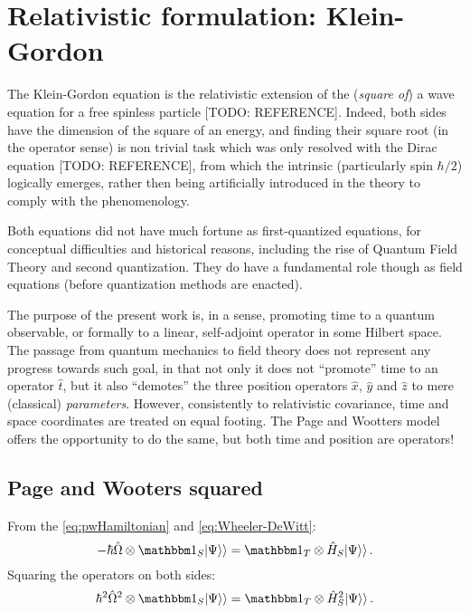 \section{Relativistic formulation: Klein-Gordon}

The Klein-Gordon equation is the relativistic extension of the
(\emph{square of}) a wave equation for a free spinless particle
[TODO: REFERENCE]. Indeed, both sides have the dimension of
the square of an energy, and finding their square root
(in the operator sense) is non trivial task which was only resolved 
with the Dirac equation [TODO: REFERENCE], from which the
intrinsic  (particularly spin $\hbar/2$) logically emerges,
rather then being artificially introduced in the theory
to comply with the phenomenology.

Both equations did not have much fortune as first-quantized equations,
for conceptual difficulties and historical reasons, including the rise
of Quantum Field Theory and second quantization. They do have a fundamental
role though as field equations (before quantization methods are enacted).

The purpose of the present work is, in a sense, promoting time to a quantum
observable, or formally to a linear, self-adjoint operator in some Hilbert space.
The passage from quantum mechanics to field theory does not represent any progress
towards such goal, in that not only it does not ``promote'' time to an operator $\hat{t}$,
but it also ``demotes'' the three position operators $\hat{x}$, $\hat{y}$ and $\hat{z}$
to mere (classical) \emph{parameters}. However, consistently to relativistic covariance,
time and space coordinates are treated on equal footing. The Page and Wootters model
offers the opportunity to do the same, but both time and position are operators!

\subsection{Page and Wooters squared}

From the \eqref{eq:pwHamiltonian} and \eqref{eq:Wheeler-DeWitt}:
\begin{equation}\label{eq:pw_to_be_squared}
  -\hbar\hat{\Omega}\ox\idop_S \dket{\Psi} = \idop_T\ox\hat{H}_S \dket{\Psi} \,\text{.}
\end{equation}
Squaring the operators on both sides:
\begin{equation}\label{eq:pw_squared}
  \hbar^{2}\hat{\Omega}^{2}\ox\idop_S \dket{\Psi} = \idop_T\ox\hat{H}_S^{2} \dket{\Psi} \,\text{.}
\end{equation}
